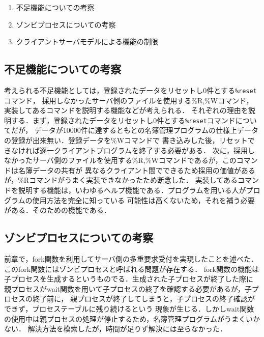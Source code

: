 \documentclass[a4paper,11pt]{jarticle}
\begin{document}
\begin{enumerate}
\setlength{\parskip}{2pt} \setlength{\itemsep}{2pt}
    \item 不足機能についての考察
    \item ゾンビプロセスについての考察
    \item クライアントサーバモデルによる機能の制限
\end{enumerate}

\subsection{不足機能についての考察}

考えられる不足機能としては，登録されたデータをリセットし0件とする\verb|%reset|コマンド，
採用しなかったサーバ側のファイルを使用する\%R,\%Wコマンド，
実装してあるコマンドを説明する機能などが考えられる．
それぞれの理由を説明する．まず，登録されたデータをリセットし0件とする\verb|%reset|コマンドについてだが，
データが10000件に達するともとの名簿管理プログラムの仕様上データの登録が出来無い．登録データを\%Wコマンドで
書き込みした後，リセットできなければ逐一クライアントプログラムを終了する必要がある．
次に，採用しなかったサーバ側のファイルを使用する\%R,\%Wコマンドであるが，このコマンドは名簿データの共有が
異なるクライアント間でできるため採用の価値があるが，\%Rコマンドがうまく実装できなかったため断念した．
実装してあるコマンドを説明する機能は，いわゆるヘルプ機能である．プログラムを用いる人がプログラムの使用方法を完全に知っている
可能性は高くないため，それを補う必要がある．そのための機能である．

\subsection{ゾンビプロセスについての考察}
前章で，fork関数を利用してサーバ側の多重要求受付を実現したことを述べた．
このfork関数にはゾンビプロセスと呼ばれる問題が存在する．
fork関数の機能は子プロセスを生成するというものでる．生成された子プロセスが終了した際に
親プロセスがwait関数を用いて子プロセスの終了を確認する必要があるが，子プロセスの終了前に，
親プロセスが終了してしまうと，子プロセスの終了確認ができず，プロセステーブルに残り続けるという
現象が生じる．しかしwait関数の使用中は親プロセスの処理が停止するため，名簿管理プログラムがうまくいかない．
解決方法を模索したが，時間が足りず解決には至らなかった．
\end{document}
